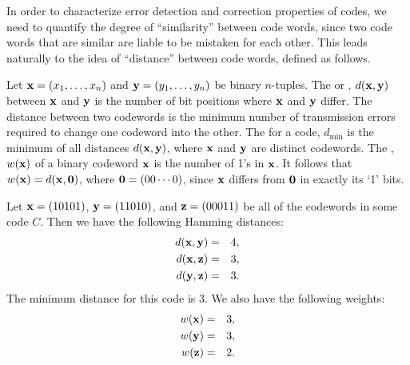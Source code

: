 In order to characterize error detection and correction properties of codes, we need to quantify the degree of ``similarity'' between code words, since two code words that are similar are liable to be mistaken for each other. This leads naturally to the idea of ``distance'' between code words, defined as follows.

\begin{defn}\label{defn:algcodes:weight} 
Let ${\bold x} = (x_1, \ldots, x_n)$ and ${\bold y} = (y_1, \ldots,
y_n)$ be binary $n$-tuples. The  or , $d({\bold x}, {\bold
y})$ between ${\bold x}$ and ${\bold y}$ is
the number of bit positions where ${\bold x}$ and ${\bold y}$ differ. The
distance between two codewords is the minimum number of transmission
errors required to change one codeword into the other. The
 for a code,
$d_{\min}$ is the minimum of all distances
$d({\bold x}, {\bold y})$, where ${\bold x}$ and ${\bold y}$ are
distinct codewords. The ,
$w({\bold x})$ of a binary codeword ${\bold x}$ is
the number of 1's in ${\bold x}$. It follows that $w({\bold x}) = d({\bold
x}, {\bold 0})$, where ${\bold 0} = (00 \cdots 0)$, since ${\bold x}$ differs from ${\bold 0}$ in exactly its `1' bits.
\end{defn} 
 
\begin{example}{}
Let ${\bold x} = (10101)$, ${\bold y} = (11010)$, and ${\bold z} =
(00011)$ be all of the codewords in some code $C$. Then we have the
following Hamming distances: 
\begin{eqnarray*}
d({\bold x},{\bold y}) & = & 4, \\
d({\bold x},{\bold z}) & = & 3, \\
d({\bold y},{\bold z}) & = & 3.
\end{eqnarray*}
The minimum distance  for this code is 3. We also have the
following weights: 
\begin{eqnarray*}
w({\bold x}) & = & 3, \\
w({\bold y}) & = & 3, \\
w({\bold z}) & = & 2.
\end{eqnarray*}
\end{example}
 
